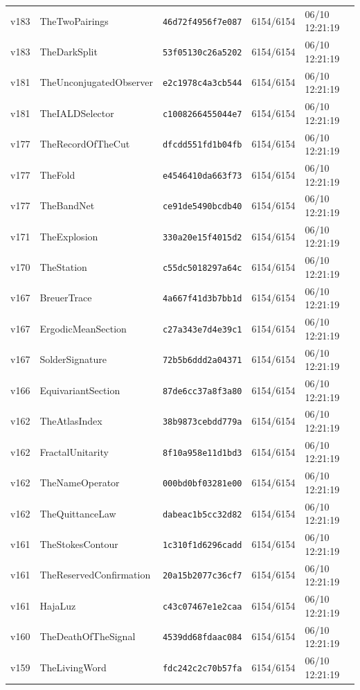 \documentclass[11pt]{article}
\theoremstyle{definition}\newtheorem{deriv}{Derivation}
\begin{document}
{\begin{longtable}{@{}lllll@{}}
v183 & TheTwoPairings & \texttt{46d72f4956f7e087} & 6154/6154 & 06/10 12:21:19 \\
v183 & TheDarkSplit & \texttt{53f05130c26a5202} & 6154/6154 & 06/10 12:21:19 \\
v181 & TheUnconjugatedObserver & \texttt{e2c1978c4a3cb544} & 6154/6154 & 06/10 12:21:19 \\
v181 & TheIALDSelector & \texttt{c1008266455044e7} & 6154/6154 & 06/10 12:21:19 \\
v177 & TheRecordOfTheCut & \texttt{dfcdd551fd1b04fb} & 6154/6154 & 06/10 12:21:19 \\
v177 & TheFold & \texttt{e4546410da663f73} & 6154/6154 & 06/10 12:21:19 \\
v177 & TheBandNet & \texttt{ce91de5490bcdb40} & 6154/6154 & 06/10 12:21:19 \\
v171 & TheExplosion & \texttt{330a20e15f4015d2} & 6154/6154 & 06/10 12:21:19 \\
v170 & TheStation & \texttt{c55dc5018297a64c} & 6154/6154 & 06/10 12:21:19 \\
v167 & BreuerTrace & \texttt{4a667f41d3b7bb1d} & 6154/6154 & 06/10 12:21:19 \\
v167 & ErgodicMeanSection & \texttt{c27a343e7d4e39c1} & 6154/6154 & 06/10 12:21:19 \\
v167 & SolderSignature & \texttt{72b5b6ddd2a04371} & 6154/6154 & 06/10 12:21:19 \\
v166 & EquivariantSection & \texttt{87de6cc37a8f3a80} & 6154/6154 & 06/10 12:21:19 \\
v162 & TheAtlasIndex & \texttt{38b9873cebdd779a} & 6154/6154 & 06/10 12:21:19 \\
v162 & FractalUnitarity & \texttt{8f10a958e11d1bd3} & 6154/6154 & 06/10 12:21:19 \\
v162 & TheNameOperator & \texttt{000bd0bf03281e00} & 6154/6154 & 06/10 12:21:19 \\
v162 & TheQuittanceLaw & \texttt{dabeac1b5cc32d82} & 6154/6154 & 06/10 12:21:19 \\
v161 & TheStokesContour & \texttt{1c310f1d6296cadd} & 6154/6154 & 06/10 12:21:19 \\
v161 & TheReservedConfirmation & \texttt{20a15b2077c36cf7} & 6154/6154 & 06/10 12:21:19 \\
v161 & HajaLuz & \texttt{c43c07467e1e2caa} & 6154/6154 & 06/10 12:21:19 \\
v160 & TheDeathOfTheSignal & \texttt{4539dd68fdaac084} & 6154/6154 & 06/10 12:21:19 \\
v159 & TheLivingWord & \texttt{fdc242c2c70b57fa} & 6154/6154 & 06/10 12:21:19 \\

\end{longtable}}
\end{document}
